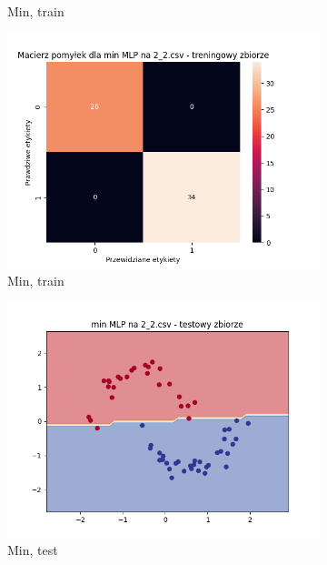 \documentclass[12pt]{article}
\newcommand*{\subfigwidth}{0.24\textwidth}
\begin{document}
\begin{figure}[H]
\begin{subfigure}[t]{\subfigwidth}
        \caption{Min, train}
    \end{subfigure}
    \hfill
    \begin{subfigure}[t]{\subfigwidth}
        \includegraphics[width=\linewidth]{img/exp_3/mlp/2_2/min/train_matrix.png}
        \caption{Min, train}
    \end{subfigure}
    \hfill
    \begin{subfigure}[t]{\subfigwidth}
        \includegraphics[width=\linewidth]{img/exp_3/mlp/2_2/min/test_boundary.png}
        \caption{Min, test}
    \end{subfigure}
    \hfill
    \begin{subfigure}[t]{\subfigwidth}

\end{subfigure}
\end{figure}
\end{document}
